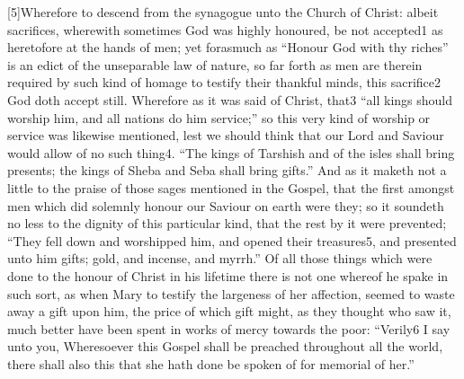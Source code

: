 [5]Wherefore to descend from the synagogue unto the Church of Christ: albeit sacrifices, wherewith sometimes God was highly honoured, be not accepted1 as heretofore at the hands of men; yet forasmuch as “Honour God with thy riches” is an edict of the unseparable law of nature, so far forth as men are therein required by such kind of homage to testify their thankful minds, this sacrifice2 God doth accept still. Wherefore as it was said of Christ, that3 “all kings should worship him, and all nations do him service;” so this very kind of worship or service was likewise mentioned, lest we should think that our Lord and Saviour would allow of no such thing4. “The kings of Tarshish and of the isles shall bring presents; the kings of Sheba and Seba shall bring gifts.” And as it maketh not a little to the praise of those sages mentioned in the Gospel, that the first amongst men which did solemnly honour our Saviour on earth were they; so it soundeth no less to the dignity of this particular kind, that the rest by it were prevented; “They fell down and worshipped him, and opened their treasures5, and presented unto him gifts; gold, and incense, and myrrh.” Of all those things which were done to the honour of Christ in his lifetime there is not one whereof he spake in such sort, as when Mary to testify the largeness of her affection, seemed to waste away a gift upon him, the price of which gift might, as they thought who saw it, much better have been spent in works of mercy towards the poor: “Verily6 I say unto you, Wheresoever this Gospel shall be preached throughout all the world, there shall also this that she hath done be spoken of for memorial of her.”

